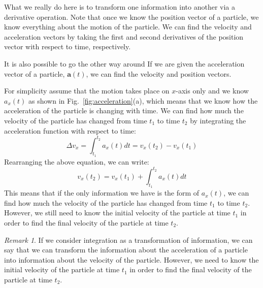\documentclass[12pt]{article}
\theoremstyle{remark}
\newtheorem*{remark}{Remark}
\begin{document}
What we really do here is to transform one information into another via a derivative operation. Note that once we know the position vector of a particle, we know everything about the motion of the particle. We can find the velocity and acceleration vectors by taking the first and second derivatives of the position vector with respect to time, respectively.

It is also possible to go the other way around If we are given the acceleration vector of a particle, $\mathbf{a}(t)$, we can find the velocity and position vectors.

For simplicity assume that the motion takes place on $x$-axis only and we know $a_x(t)$ as shown in Fig.~\ref{fig:acceleration}(a), which means that we know how the acceleration of the particle is changing with time. We can find how much the velocity of the particle has changed from time $t_1$ to time $t_2$ by integrating the acceleration function with respect to time:
\begin{equation}
    \Delta v_x = \int_{t_1}^{t_2} a_x(t) dt = v_x(t_2) - v_x(t_1)
\end{equation}
Rearranging the above equation, we can write:
\begin{equation}
    v_x(t_2) = v_x(t_1) + \int_{t_1}^{t_2} a_x(t) dt
\end{equation}
This means that if the only information we have is the form of $a_x(t)$, we can find how much the velocity of the particle has changed from time $t_1$ to time $t_2$. However, we still need to know the initial velocity of the particle at time $t_1$ in order to find the final velocity of the particle at time $t_2$. 

\begin{remark}
If we consider integration as a transformation of information, we can say that we can transform the information about the acceleration of a particle into information about the velocity of the particle. However, we need to know the initial velocity of the particle at time $t_1$ in order to find the final velocity of the particle at time $t_2$. 
\end{remark}
\end{document}
